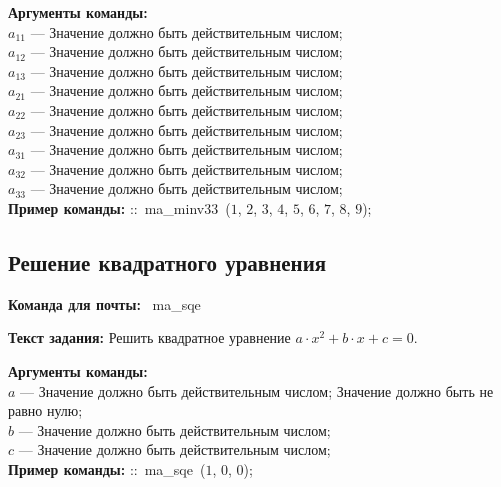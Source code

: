 \noindent \textbf{Аргументы команды:}\\ $a_{11}$ ---  Значение должно быть действительным числом;\\
$a_{12}$ ---  Значение должно быть действительным числом;\\
$a_{13}$ ---  Значение должно быть действительным числом;\\
$a_{21}$ ---  Значение должно быть действительным числом;\\
$a_{22}$ ---  Значение должно быть действительным числом;\\
$a_{23}$ ---  Значение должно быть действительным числом;\\
$a_{31}$ ---  Значение должно быть действительным числом;\\
$a_{32}$ ---  Значение должно быть действительным числом;\\
$a_{33}$ ---  Значение должно быть действительным числом;\\
 

\noindent \textbf{Пример команды:} ::\mbox{ ma\_minv33 }($1$, $2$, $3$, $4$, $5$, $6$, $7$, $8$, $9$);

\subsection{Решение квадратного уравнения}

\noindent \textbf{Команда для почты:} \mbox{ ma\_sqe }

\noindent \textbf{Текст задания:} Решить квадратное уравнение $a\cdot x^2+b\cdot x+c=0$.

\noindent \textbf{Аргументы команды:}\\ $a$ ---  Значение должно быть действительным числом; Значение должно быть не равно нулю;\\
$b$ ---  Значение должно быть действительным числом;\\
$c$ ---  Значение должно быть действительным числом;\\
 

\noindent \textbf{Пример команды:} ::\mbox{ ma\_sqe }($1$, $0$, $0$);

